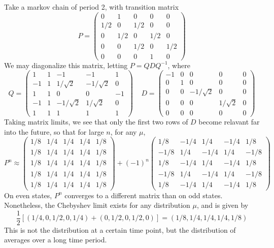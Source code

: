 \begin{example}
    Take a markov chain of period 2, with transition matrix
    \[ P = \begin{pmatrix} 0 & 1 & 0 & 0 & 0 \\ 1/2 & 0 & 1/2 & 0 & 0 \\ 0 & 1/2 & 0 & 1/2 & 0 \\ 0 & 0 & 1/2 & 0 & 1/2 \\ 0 & 0 & 0 & 1 & 0 \end{pmatrix} \]
    We may diagonalize this matrix, letting $P = QDQ^{-1}$, where
    \[ Q = \begin{pmatrix} 1 & 1 & -1 & -1 & 1 \\ -1 & 1 & 1/\sqrt{2} & -1/\sqrt{2} & 0 \\ 1 & 1 & 0 & 0 & -1 \\ -1 & 1 & -1/\sqrt{2} & 1/\sqrt{2} & 0 \\ 1 & 1 & 1 & 1 & 1 \end{pmatrix}\ \ \ \ \ D = \begin{pmatrix} -1 & 0 & 0 & 0 & 0 \\ 0 & 1 & 0 & 0 & 0 \\ 0 & 0 & -1/\sqrt{2} & 0 & 0 \\ 0 & 0 & 0 & 1/\sqrt{2} & 0 \\ 0 & 0 & 0 & 0 & 0 \end{pmatrix} \]
    Taking matrix limits, we see that only the first two rows of $D$ become relavant far into the future, so that for large $n$, for any $\mu$,
    \[ P^n \approx \begin{pmatrix} 1/8 & 1/4 & 1/4 & 1/4 & 1/8 \\ 1/8 & 1/4 & 1/4 & 1/4 & 1/8 \\ 1/8 & 1/4 & 1/4 & 1/4 & 1/8 \\ 1/8 & 1/4 & 1/4 & 1/4 & 1/8 \\ 1/8 & 1/4 & 1/4 & 1/4 & 1/8 \end{pmatrix} + (-1)^n \begin{pmatrix} 1/8 & -1/4 & 1/4 & -1/4 & 1/8 \\ -1/8 & 1/4 & -1/4 & 1/4 & -1/8 \\ 1/8 & -1/4 & 1/4 & -1/4 & 1/8 \\ -1/8 & 1/4 & -1/4 & 1/4 & -1/8 \\ 1/8 & -1/4 & 1/4 & -1/4 & 1/8 \end{pmatrix} \]
    On even states, $P^n$ converges to a different matrix than on odd states. Nonetheless, the Chebyshev limit exists for any distribution $\mu$, and is given by
    \[ \frac{1}{2}[(1/4, 0, 1/2, 0, 1/4) + (0, 1/2, 0, 1/2, 0)] = (1/8, 1/4, 1/4, 1/4, 1/8) \]
    This is not the distribution at a certain time point, but the distribution of averages over a long time period.
\end{example}

